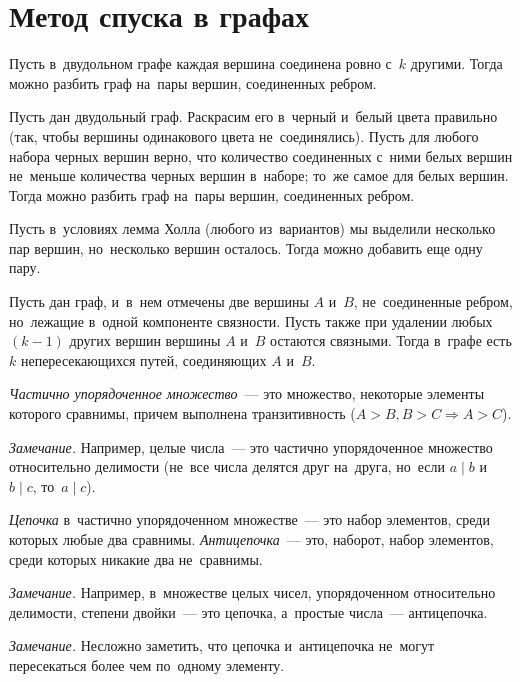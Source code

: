 
\section*{Метод спуска в графах}


Пусть в~двудольном графе каждая вершина соединена ровно с~$k$ другими.
Тогда можно разбить граф на~пары вершин, соединенных ребром.

Пусть дан двудольный граф.
Раскрасим его в~черный и~белый цвета правильно (так, чтобы вершины одинакового
цвета не~соединялись).
Пусть для любого набора черных вершин верно, что количество соединенных с~ними
белых вершин не~меньше количества черных вершин в~наборе;
то~же самое для белых вершин.
Тогда можно разбить граф на~пары вершин, соединенных ребром.

Пусть в~условиях лемма Холла (любого из~вариантов) мы выделили несколько пар
вершин, но~несколько вершин осталось.
Тогда можно добавить еще одну пару.

Пусть дан граф, и~в~нем отмечены две вершины $A$ и~$B$, не~соединенные ребром,
но~лежащие в~одной компоненте связности.
Пусть также при удалении любых $(k - 1)$ других вершин вершины $A$ и~$B$
остаются связными.
Тогда в~графе есть $k$ непересекающихся путей, соединяющих $A$ и~$B$.

\emph{Частично упорядоченное множество}~--- это множество, некоторые элементы
которого сравнимы, причем выполнена транзитивность
($A > B, B > C \Rightarrow A > C$).

\emph{Замечание.}
Например, целые числа~--- это частично упорядоченное множество относительно
делимости (не~все числа делятся друг на~друга, но~если $a \mid b$ и~$b \mid c$,
то~$a \mid c$).

\emph{Цепочка} в~частично упорядоченном множестве~--- это набор элементов,
среди которых любые два сравнимы.
\emph{Антицепочка}~--- это, наборот, набор элементов, среди которых никакие два
не~сравнимы.

\emph{Замечание.}
Например, в~множестве целых чисел, упорядоченном относительно делимости,
степени двойки~--- это цепочка, а~простые числа~--- антицепочка.

\emph{Замечание.}
Несложно заметить, что цепочка и~антицепочка не~могут пересекаться более чем
по~одному элементу.

